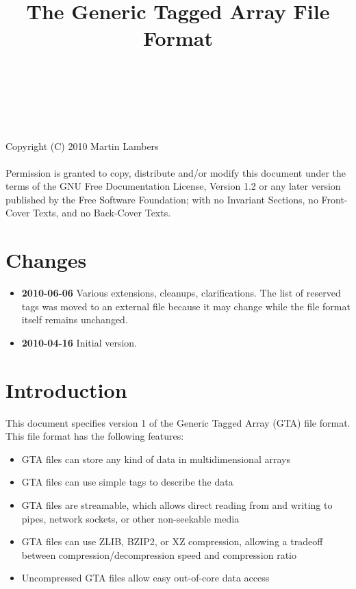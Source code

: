 \documentclass[a4paper,11pt]{article}
\begin{document}
\title{The Generic Tagged Array File Format}
\author{~}
\date{~}
\maketitle

\noindent
{\scriptsize
Copyright (C) 2010 Martin Lambers\\~\\
Permission is granted to copy, distribute and/or modify this document
under the terms of the GNU Free Documentation License, Version 1.2 or
any later version published by the Free Software Foundation; with no
Invariant Sections, no Front-Cover Texts, and no Back-Cover Texts.
}


{}
\section*{Changes}

\begin{itemize}
\item \textbf{2010-06-06} Various extensions, cleanups, clarifications.
The list of reserved tags was moved to an external file because it may change
while the file format itself remains unchanged.
\item \textbf{2010-04-16} Initial version.
\end{itemize}


{}
\section*{Introduction}

This document specifies version 1 of the Generic Tagged Array (GTA) file format.
This file format has the following features:
\begin{itemize}
\item GTA files can store any kind of data in multidimensional arrays
\item GTA files can use simple tags to describe the data
\item GTA files are streamable, which allows direct reading from and
	writing to pipes, network sockets, or other non-seekable media
\item GTA files can use ZLIB, BZIP2, or XZ compression, 
	allowing a tradeoff between compression/decompression speed and
	compression ratio
\item Uncompressed GTA files allow easy out-of-core data access
\end{itemize}
\end{document}
